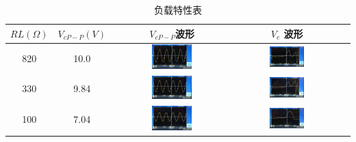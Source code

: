 \documentclass[12pt]{article}%
\numberwithin{equation}{section}
\begin{document}
\begin{table}[htbp]
\centering
\caption{负载特性表}
\label{tab:fuzaitexing}
\begin{tabular}{|c|c|c|c|c|}
\hline
$RL(\Omega)$ & $V_{cP-P}(V)$ &$V_{cP-P}$波形& $V_e$ 波形 \\\hline
820          &        10.0       &  \includegraphics[width=0.35\textwidth]{gaopin4/gaopin422.jpg}   &  \includegraphics[width=0.35\textwidth]{gaopin4/gaopin418.jpg}   \\\hline
330          &         9.84      &   \includegraphics[width=0.35\textwidth]{gaopin4/gaopin421.jpg}  &   \includegraphics[width=0.35\textwidth]{gaopin4/gaopin419.jpg}  \\\hline
100          &          7.04     &    \includegraphics[width=0.35\textwidth]{gaopin4/gaopin420.jpg} &    \includegraphics[width=0.35\textwidth]{gaopin4/gaopin416.jpg}  \\\hline

\end{tabular}
\end{table}
\end{document}
